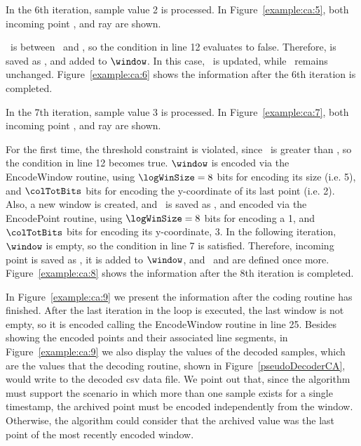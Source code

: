 In the 6th iteration, sample value 2 is processed. In Figure~\ref{example:ca:5}, both incoming point , and ray  are shown. 




\ is between \smin\ and \smax, so the condition in line 12 evaluates to false. Therefore,  is saved as \snapshot, and added to $\window$. In this case, \smin\ is updated, while \smax\ remains unchanged. Figure~\ref{example:ca:6} shows the information after the 6th iteration is completed.




\clearpage

In the 7th iteration, sample value 3 is processed. In Figure~\ref{example:ca:7}, both incoming point , and ray  are shown. 



For the first time, the threshold constraint is violated, since \ is greater than \smax, so the condition in line 12 becomes true. $\window$ is encoded via the EncodeWindow routine, using $\logWinSize = 8$ bits for encoding its size (i.e. 5), and $\colTotBits$ bits for encoding the y-coordinate of its last point (i.e. 2). Also, a new window is created, and \ is saved as \archived, and encoded via the EncodePoint routine, using $\logWinSize =8$ bits for encoding a 1, and $\colTotBits$ bits for encoding its y-coordinate, 3. In the following iteration, $\window$ is empty, so the condition in line 7 is satisfied. Therefore, incoming point  is saved as \snapshot, it is added to $\window$, and \smin\ and \smax are defined once more. Figure~\ref{example:ca:8} shows the information after the 8th iteration is completed.




\clearpage


In Figure~\ref{example:ca:9} we present the information after the coding routine has finished. After the last iteration in the loop is executed, the last window is not empty, so it is encoded calling the EncodeWindow routine in line 25. Besides showing the encoded points and their associated line segments, in Figure~\ref{example:ca:9} we also display the values of the decoded samples, which are the values that the decoding routine, shown in Figure~\ref{pseudoDecoderCA}, would write to the decoded csv data file. We point out that, since the algorithm must support the scenario in which more than one sample exists for a single timestamp, the archived point must be encoded independently from the window. Otherwise, the algorithm could consider that the archived value was the last point of the most recently encoded window.


